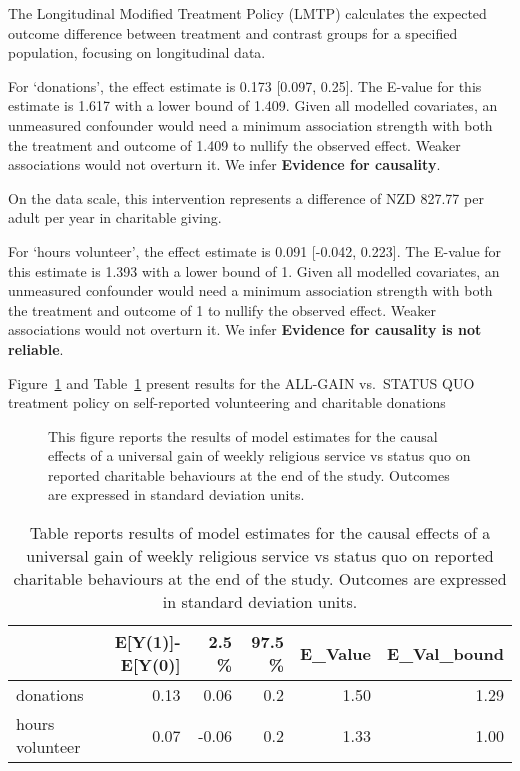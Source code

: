 \documentclass[
  singlecolumn]{article}
\begin{document}
The Longitudinal Modified Treatment Policy (LMTP) calculates the
expected outcome difference between treatment and contrast groups for a
specified population, focusing on longitudinal data.

For `donations', the effect estimate is 0.173 {[}0.097, 0.25{]}. The
E-value for this estimate is 1.617 with a lower bound of 1.409. Given
all modelled covariates, an unmeasured confounder would need a minimum
association strength with both the treatment and outcome of 1.409 to
nullify the observed effect. Weaker associations would not overturn it.
We infer \textbf{Evidence for causality}.

On the data scale, this intervention represents a difference of NZD
827.77 per adult per year in charitable giving.

For `hours volunteer', the effect estimate is 0.091 {[}-0.042, 0.223{]}.
The E-value for this estimate is 1.393 with a lower bound of 1. Given
all modelled covariates, an unmeasured confounder would need a minimum
association strength with both the treatment and outcome of 1 to nullify
the observed effect. Weaker associations would not overturn it. We infer
\textbf{Evidence for causality is not reliable}.

\newpage{}

Figure~\ref{fig-1_2} and Table~\ref{tbl-1_2} present results for the
ALL-GAIN vs.~STATUS QUO treatment policy on self-reported volunteering
and charitable donations

\begin{figure}


\caption{\label{fig-1_2}This figure reports the results of model
estimates for the causal effects of a universal gain of weekly religious
service vs status quo on reported charitable behaviours at the end of
the study. Outcomes are expressed in standard deviation units.}

\end{figure}%

\begin{longtable}[]{@{}lrrrrr@{}}

\caption{\label{tbl-1_2}Table reports results of model estimates for the
causal effects of a universal gain of weekly religious service vs status
quo on reported charitable behaviours at the end of the study. Outcomes
are expressed in standard deviation units.}

\tabularnewline

\toprule\noalign{}
& E{[}Y(1){]}-E{[}Y(0){]} & 2.5 \% & 97.5 \% & E\_Value &
E\_Val\_bound \\
\midrule\noalign{}
\endhead
\bottomrule\noalign{}
\endlastfoot
donations & 0.13 & 0.06 & 0.2 & 1.50 & 1.29 \\
hours volunteer & 0.07 & -0.06 & 0.2 & 1.33 & 1.00 \\

\end{longtable}
\end{document}
